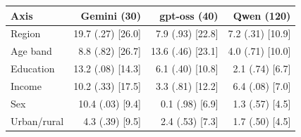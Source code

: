 \setlength{\tabcolsep}{2.4pt}
\begin{tabular}{@{}lrrr@{}}
\toprule
\textbf{Axis} & \textbf{Gemini (30)} & \textbf{gpt-oss (40)} & \textbf{Qwen (120)} \\
\midrule
Region & 19.7 (.27) [26.0] & 7.9 (.93) [22.8] & 7.2 (.31) [10.9] \\
Age band & 8.8 (.82) [26.7] & 13.6 (.46) [23.1] & 4.0 (.71) [10.0] \\
Education & 13.2 (.08) [14.3] & 6.1 (.40) [10.8] & 2.1 (.74) [6.7] \\
Income & 10.2 (.33) [17.5] & 3.3 (.81) [12.2] & 6.4 (.08) [7.0] \\
Sex & 10.4 (.03) [9.4] & 0.1 (.98) [6.9] & 1.3 (.57) [4.5] \\
Urban/rural & 4.3 (.39) [9.5] & 2.4 (.53) [7.3] & 1.7 (.50) [4.5] \\
\bottomrule
\end{tabular}
